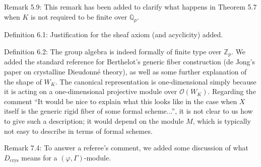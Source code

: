\documentclass[12pt]{amsart}
\begin{document}
Remark 5.9: This remark has been added to clarify what happens in Theorem 5.7 when $K$ is not required to be finite over $\mathbb{Q}_p$.

Definition 6.1: Justification for the sheaf axiom (and acyclicity) added.

Definition 6.2: The group algebra is indeed formally of finite type over $\mathbb{Z}_p$. We added the standard reference for Berthelot's generic fiber construction (de Jong's paper on crystalline Dieudonn\'e theory), as well as some further explanation of the shape of $W_K$. The canonical representation is one-dimensional simply because it is acting on a one-dimensional projective module over $\mathcal{O}(W_K)$. Regarding the comment ``It would be nice to explain what this looks like in the case when $X$ itself is the generic rigid fiber of some formal scheme...'', it is not clear to us how to give such a description; it would depend on the module $M$, which is typically not easy to describe in terms of formal schemes.

Remark 7.4: To answer a referee's comment, we added some discussion of what $D_{\mathrm{crys}}$ means for a $(\varphi, \Gamma)$-module.
\end{document}
